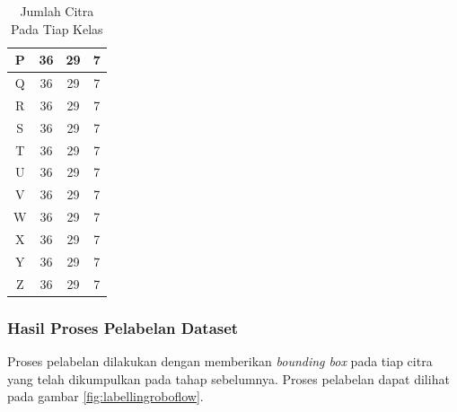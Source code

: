 \begin{table}[H]
\begin{center}
\begin{tabular}{|c|c|c|c|}
    P                                    & 36                     & 29                  & 7                  \\ \hline
    Q                                    & 36                     & 29                  & 7                  \\ \hline
    R                                    & 36                     & 29                  & 7                  \\ \hline
    S                                    & 36                     & 29                  & 7                  \\ \hline
    T                                    & 36                     & 29                  & 7                  \\ \hline
    U                                    & 36                     & 29                  & 7                  \\ \hline
    V                                    & 36                     & 29                  & 7                  \\ \hline
    W                                    & 36                     & 29                  & 7                  \\ \hline
    X                                    & 36                     & 29                  & 7                  \\ \hline
    Y                                    & 36                     & 29                  & 7                  \\ \hline
    Z                                    & 36                     & 29                  & 7                  \\ \hline
    \end{tabular}
  \end{center}
  
  \caption{Jumlah Citra Pada Tiap Kelas}
  \label{tb:citrapadatiapkelas}
  \end{table}

\subsubsection{Hasil Proses Pelabelan Dataset}
\label{subsubsec:hasilpelabelan}

Proses pelabelan dilakukan dengan memberikan \textit{bounding box} pada tiap citra yang telah dikumpulkan pada tahap sebelumnya. Proses pelabelan dapat dilihat pada gambar \ref{fig:labellingroboflow}. \par

